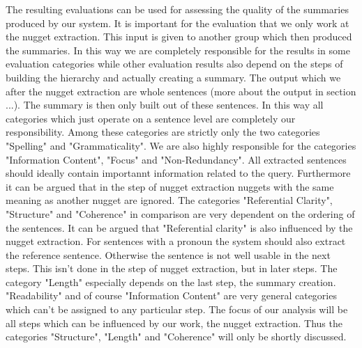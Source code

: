 The resulting evaluations can be used for assessing the quality of the summaries produced by our system. It is important for the evaluation that we only work at the nugget extraction. This input is given to another group which then produced the summaries. In this way we are completely responsible for the results in some evaluation categories while other evaluation results also depend on the steps of  building the hierarchy and actually creating a summary. The output which we after the nugget extraction are whole sentences (more about the output in section ...). The summary is then only built out of these sentences. In this way all categories which just operate on a sentence level are completely our responsibility. Among these categories are strictly only the two categories "Spelling" and "Grammaticality". We are also highly responsible for the categories "Information Content", "Focus" and "Non-Redundancy". All extracted sentences should ideally contain importannt information related to the query. Furthermore it can be argued that in the step of nugget extraction nuggets with the same meaning as another nugget are ignored. The categories "Referential Clarity", "Structure" and "Coherence" in comparison are very dependent on the ordering of the sentences. It can be argued that "Referential clarity" is also influenced by the nugget extraction. For sentences with a pronoun the system should also extract the reference sentence. Otherwise the sentence is not well usable in the next steps. This isn't done in the step of nugget extraction, but in later steps. The category "Length" especially depends on the last step, the summary creation. "Readability" and of course "Information Content" are very general categories which can't be assigned to any particular step. The focus of our analysis will be all steps which can be influenced by our work, the nugget extraction. Thus the categories "Structure", "Length" and "Coherence" will only be shortly discussed.

